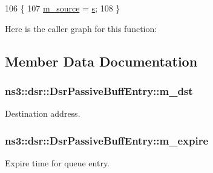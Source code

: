 \begin{DoxyCode}
106   \{
107     \hyperlink{classns3_1_1dsr_1_1DsrPassiveBuffEntry_ad712ad7f3db0141e74b08aacefc8ca07}{m\_source} = \hyperlink{generate__test__data__lte__sinr_8m_ad83eeb3a142285d1243a08c6b7026df8}{s};
108   \}
\end{DoxyCode}


Here is the caller graph for this function\+:




\subsection{Member Data Documentation}
\subsubsection[{\texorpdfstring{m\+\_\+dst}{m_dst}}]{ ns3\+::dsr\+::\+Dsr\+Passive\+Buff\+Entry\+::m\+\_\+dst\hspace{0.3cm}{\ttfamily [private]}}\hypertarget{classns3_1_1dsr_1_1DsrPassiveBuffEntry_a56a5c25f1a78e60d9f6a063d289ca2ef}{}\label{classns3_1_1dsr_1_1DsrPassiveBuffEntry_a56a5c25f1a78e60d9f6a063d289ca2ef}


Destination address. 

\subsubsection[{\texorpdfstring{m\+\_\+expire}{m_expire}}]{ ns3\+::dsr\+::\+Dsr\+Passive\+Buff\+Entry\+::m\+\_\+expire\hspace{0.3cm}{\ttfamily [private]}}\hypertarget{classns3_1_1dsr_1_1DsrPassiveBuffEntry_af64477899c96ab65a190d75e378cfc90}{}\label{classns3_1_1dsr_1_1DsrPassiveBuffEntry_af64477899c96ab65a190d75e378cfc90}


Expire time for queue entry. 

